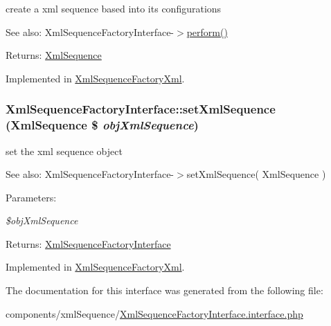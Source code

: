 create a xml sequence based into its configurations

\begin{Desc}
\item[See also:]XmlSequenceFactoryInterface-$>$\hyperlink{interface_xml_sequence_factory_interface_c06f18d6c688317b41477c315f7008f7}{perform()} \end{Desc}
\begin{Desc}
\item[Returns:]\hyperlink{class_xml_sequence}{XmlSequence} \end{Desc}


Implemented in \hyperlink{class_xml_sequence_factory_xml_f9deb0d1efc6f6e726837251a5759bcc}{XmlSequenceFactoryXml}.\hypertarget{interface_xml_sequence_factory_interface_8fbb97bc3fbf487c357f5a255a3a2357}{
\subsubsection[{setXmlSequence}]{\setlength{\rightskip}{0pt plus 5cm}XmlSequenceFactoryInterface::setXmlSequence ({\bf XmlSequence} \$ {\em objXmlSequence})}}
\label{interface_xml_sequence_factory_interface_8fbb97bc3fbf487c357f5a255a3a2357}


set the xml sequence object

\begin{Desc}
\item[See also:]XmlSequenceFactoryInterface-$>$setXmlSequence( XmlSequence ) \end{Desc}
\begin{Desc}
\item[Parameters:]
\begin{description}
\item[{\em \$objXmlSequence}]\end{description}
\end{Desc}
\begin{Desc}
\item[Returns:]\hyperlink{interface_xml_sequence_factory_interface}{XmlSequenceFactoryInterface} \end{Desc}


Implemented in \hyperlink{class_xml_sequence_factory_xml_c1282bb7211c84aff732419317312152}{XmlSequenceFactoryXml}.

The documentation for this interface was generated from the following file:\begin{CompactItemize}
\item 
components/xmlSequence/\hyperlink{_xml_sequence_factory_interface_8interface_8php}{XmlSequenceFactoryInterface.interface.php}\end{CompactItemize}
